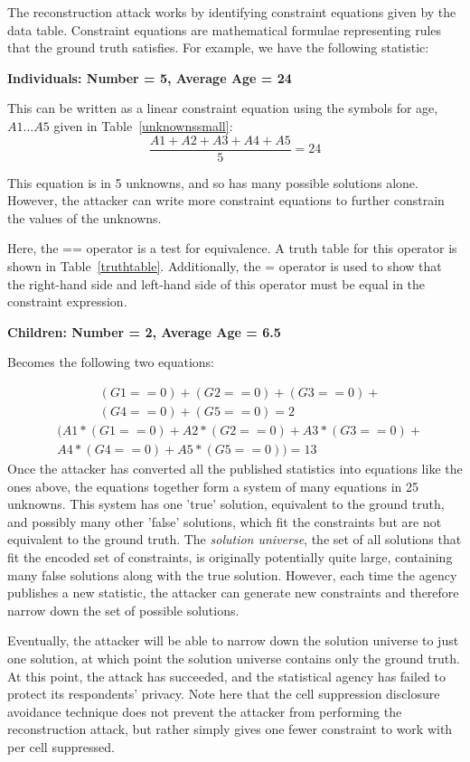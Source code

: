 \documentclass[5p,times,11pt]{elsarticle}
\begin{document}
The reconstruction attack works by identifying constraint
equations given by the data table. Constraint equations are  mathematical formulae representing rules that the ground truth satisfies. For example, we have the
following statistic:

\textbf{Individuals: Number = 5, Average Age = 24}


This can be written as a linear constraint equation using the symbols for age, $A1...A5$ given in Table~\ref{unknownssmall}:
\[\frac{A1 + A2 + A3 + A4 + A5}{5} = 24\]

This equation is in 5 unknowns, and so has many possible solutions alone.
However, the attacker can write more constraint equations to further constrain the values of the unknowns.

Here, the == operator is a test for equivalence. A truth table for this operator is shown in Table~\ref{truthtable}. Additionally, the = operator is used to show that the right-hand side and left-hand side of this operator must be equal in the constraint expression.


\textbf{Children: Number = 2, Average Age = 6.5}


Becomes the following two equations:

\begin{align*}
& (G1==0) + (G2==0) + (G3==0)+\\
& (G4==0)+  (G5==0) = 2
\end{align*}
\begin{align*}
& (A1 * (G1==0) + A2 * (G2==0) + A3 * (G3==0) +\\
& A4 * (G4==0) +  A5 * (G5==0)) = 13
\end{align*}
Once the attacker has converted all the published statistics
into equations like the ones above, the equations together form a system of many equations in 25 unknowns. This system has one 'true' solution, equivalent to the
ground truth, and possibly many other 'false' solutions, which fit the constraints but are not equivalent to the ground truth.
The \textit{solution universe}, the set of all solutions that fit the encoded set of constraints, is originally potentially  quite large, containing many false solutions along with the true solution.
However, each time the agency publishes a new statistic, the attacker can generate new constraints and therefore narrow
down the set of possible solutions.

Eventually, the attacker
will be able to narrow down the solution universe to just one solution, at which point the solution universe contains only
the ground truth. At this point, the attack has succeeded, and the statistical agency has failed to protect its respondents' privacy. Note here that the cell suppression disclosure avoidance technique does not prevent the attacker from performing the reconstruction attack, but rather simply gives one fewer constraint to work with per cell suppressed.
\end{document}
